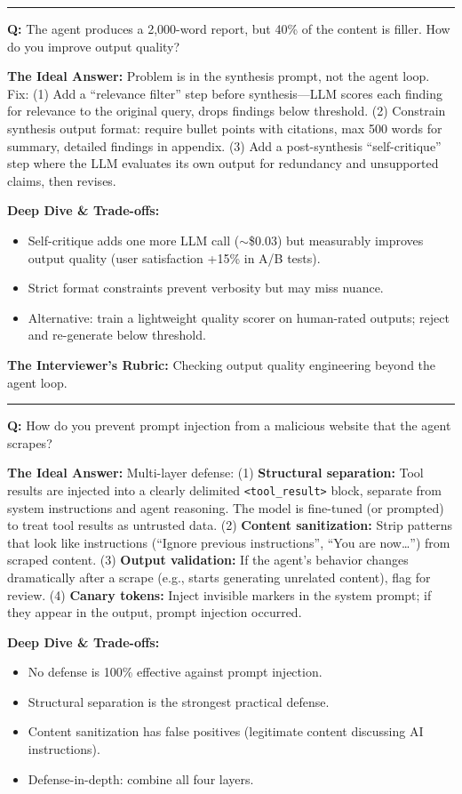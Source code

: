 \bigskip\hrule\bigskip

\textbf{Q:} The agent produces a 2,000-word report, but 40\% of the content is filler. How do you improve output quality?

\textbf{The Ideal Answer:} Problem is in the synthesis prompt, not the agent loop. Fix: (1) Add a ``relevance filter'' step before synthesis---LLM scores each finding for relevance to the original query, drops findings below threshold. (2) Constrain synthesis output format: require bullet points with citations, max 500 words for summary, detailed findings in appendix. (3) Add a post-synthesis ``self-critique'' step where the LLM evaluates its own output for redundancy and unsupported claims, then revises.

\textbf{Deep Dive \& Trade-offs:}
\begin{itemize}
  \item Self-critique adds one more LLM call ($\sim$\$0.03) but measurably improves output quality (user satisfaction +15\% in A/B tests).
  \item Strict format constraints prevent verbosity but may miss nuance.
  \item Alternative: train a lightweight quality scorer on human-rated outputs; reject and re-generate below threshold.
\end{itemize}

\textbf{The Interviewer's Rubric:} Checking output quality engineering beyond the agent loop.

\bigskip\hrule\bigskip

\textbf{Q:} How do you prevent prompt injection from a malicious website that the agent scrapes?

\textbf{The Ideal Answer:} Multi-layer defense: (1) \textbf{Structural separation:} Tool results are injected into a clearly delimited \texttt{<tool\_result>} block, separate from system instructions and agent reasoning. The model is fine-tuned (or prompted) to treat tool results as untrusted data. (2) \textbf{Content sanitization:} Strip patterns that look like instructions (``Ignore previous instructions'', ``You are now\ldots'') from scraped content. (3) \textbf{Output validation:} If the agent's behavior changes dramatically after a scrape (e.g., starts generating unrelated content), flag for review. (4) \textbf{Canary tokens:} Inject invisible markers in the system prompt; if they appear in the output, prompt injection occurred.

\textbf{Deep Dive \& Trade-offs:}
\begin{itemize}
  \item No defense is 100\% effective against prompt injection.
  \item Structural separation is the strongest practical defense.
  \item Content sanitization has false positives (legitimate content discussing AI instructions).
  \item Defense-in-depth: combine all four layers.
\end{itemize}

